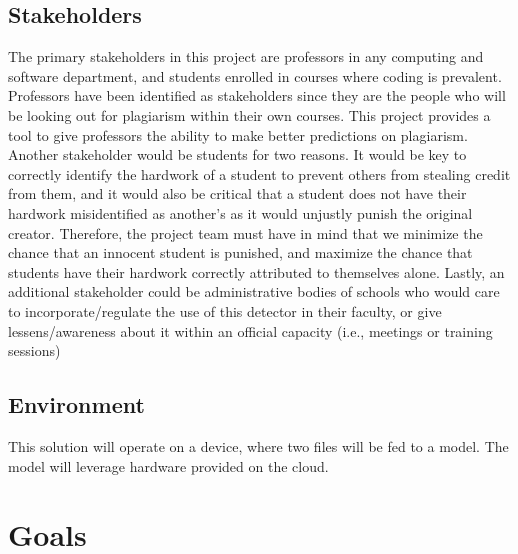 \documentclass{article}
\begin{document}

\subsection{Stakeholders}
The primary stakeholders in this project are professors in any computing and software department, and students enrolled in courses where coding is prevalent. Professors have been identified as stakeholders since they are the people who will be looking out for plagiarism within their own courses. This project provides a tool to give professors the ability to make better predictions on plagiarism. Another stakeholder would be students for two reasons. It would be key to correctly identify the hardwork of a student to prevent others from stealing credit from them, and it would also be critical that a student does not have their hardwork misidentified as another's as it would unjustly punish the original creator. Therefore, the project team must have in mind that we minimize the chance that an innocent student is punished, and maximize the chance that students have their hardwork correctly attributed to themselves alone. Lastly, an additional stakeholder could be administrative bodies of schools who would care to incorporate/regulate the use of this detector in their faculty, or give lessens/awareness about it within an official capacity (i.e., meetings or training sessions)

\subsection{Environment}
This solution will operate on a device, where two files will be fed to a model. The model will leverage hardware provided on the cloud.



\section{Goals}
\end{document}
